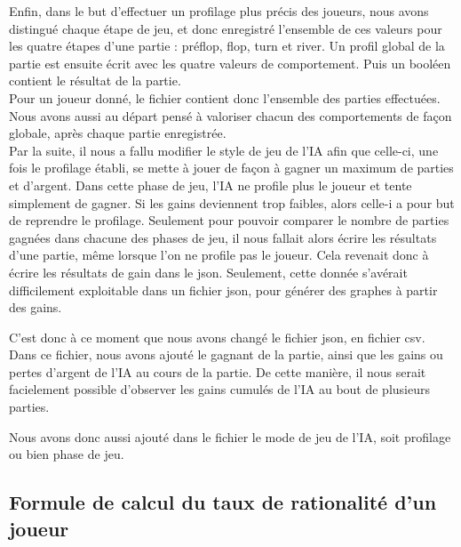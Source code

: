 \documentclass{report}
\begin{document}
Enfin, dans le but d'effectuer un profilage plus précis des joueurs, nous avons distingué chaque étape de jeu, et donc enregistré l'ensemble de ces valeurs pour les quatre étapes d'une partie : préflop, flop, turn et river. Un profil global de la partie est ensuite écrit avec les quatre valeurs de comportement. Puis un booléen contient le résultat de la partie.\\

Pour un joueur donné, le fichier contient donc l'ensemble des parties effectuées. Nous avons aussi au départ pensé à valoriser chacun des comportements de façon globale, après chaque partie enregistrée.\\

Par la suite, il nous a fallu modifier le style de jeu de l'IA afin que celle-ci, une fois le profilage établi, se mette à jouer de façon à gagner un maximum de parties et d'argent. Dans cette phase de jeu, l'IA ne profile plus le joueur et tente simplement de gagner. Si les gains deviennent trop faibles, alors celle-i a pour but de reprendre le profilage. Seulement pour pouvoir comparer le nombre de parties gagnées dans chacune des phases de jeu, il nous fallait alors écrire les résultats d'une partie, même lorsque l'on ne profile pas le joueur. Cela revenait donc à écrire les résultats de gain dans le json. Seulement, cette donnée s'avérait difficilement exploitable dans un fichier json, pour générer des graphes à partir des gains.\par
C'est donc à ce moment que nous avons changé le fichier json, en fichier csv. Dans ce fichier, nous avons ajouté le gagnant de la partie, ainsi que les gains ou pertes d'argent de l'IA au cours de la partie. De cette manière, il nous serait facielement possible d'observer les gains cumulés de l'IA au bout de plusieurs parties.\par
Nous avons donc aussi ajouté dans le fichier le mode de jeu de l'IA, soit profilage ou bien phase de jeu.\\

\subsection{Formule de calcul du taux de rationalité d'un joueur}
\end{document}
